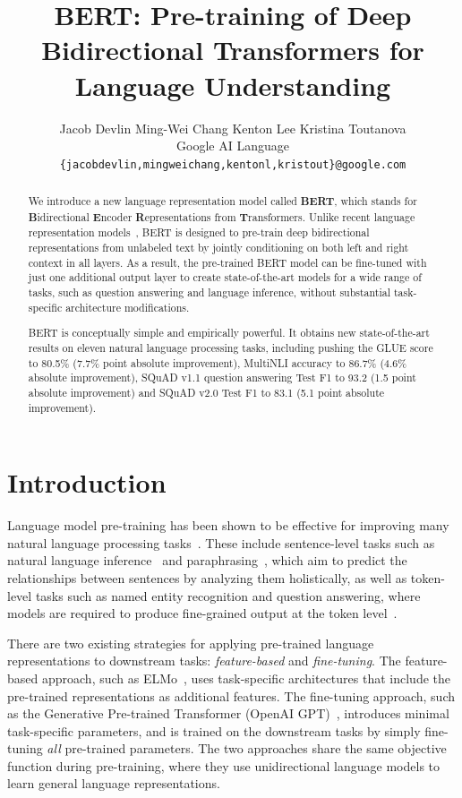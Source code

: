 \documentclass[11pt,a4paper]{article}
\title{\textbf{BERT}: Pre-training of Deep Bidirectional Transformers for \\ Language Understanding}
\author{Jacob Devlin \quad Ming-Wei Chang \quad Kenton Lee \quad Kristina Toutanova \\
  Google AI Language \\
  {\tt \{jacobdevlin,mingweichang,kentonl,kristout\}@google.com} \\}
\date{}
\newcommand\bert{BERT\xspace}
\begin{document}
\maketitle
\begin{abstract}
We introduce a new language representation model called {\bf \bert}, which stands for \textbf{B}idirectional \textbf{E}ncoder \textbf{R}epresentations from \textbf{T}ransformers. Unlike recent language representation models~\cite{peters-etal:2018:_deep, radford-etal:2018},  \bert is designed to pre-train deep bidirectional representations from unlabeled text by jointly conditioning on both left and right context in all layers. As a result, the pre-trained BERT model can be fine-tuned with just one additional output layer to create state-of-the-art models for a wide range of tasks, such as question answering and language inference, without substantial task-specific architecture modifications. 

\bert is conceptually simple and empirically powerful. It obtains new state-of-the-art results on eleven natural language processing tasks, including pushing the GLUE score to 80.5\% (7.7\% point absolute improvement), MultiNLI accuracy to 86.7\% (4.6\% absolute improvement), SQuAD v1.1 question answering Test F1 to 93.2 (1.5 point absolute improvement) and SQuAD v2.0 Test F1 to 83.1 (5.1 point absolute improvement).


\end{abstract}

\section{Introduction}


Language model pre-training has been shown to be effective for improving many natural language processing tasks~\cite{dai-le:2015:_semi, peters-etal:2018:_deep, radford-etal:2018, howard-ruder:2018}. These include sentence-level tasks such as natural language inference~\cite{bowman-etal:2015, williams-nangia-bowman:2018} and paraphrasing~\cite{dolan-brockett:2005:_autom}, which aim to predict the relationships between sentences by analyzing them holistically, as well as token-level tasks such as named entity recognition and question answering, where models are required to produce fine-grained output at the token level~\cite{tjong-de:2003, rajpurkar-etal:2016:_squad}.


There are two existing strategies for applying pre-trained language representations to downstream tasks: {\em feature-based} and {\em fine-tuning}. The feature-based approach, such as ELMo~\cite{peters-etal:2018:_deep}, uses task-specific architectures that include the pre-trained representations as additional features. The fine-tuning approach, such as the Generative Pre-trained Transformer (OpenAI GPT)~\cite{radford-etal:2018}, introduces minimal task-specific parameters, and is trained on the downstream tasks by simply fine-tuning {\em all} pre-trained parameters. The two approaches share the same objective function during pre-training, where they use unidirectional language models to learn general language representations.
\end{document}
